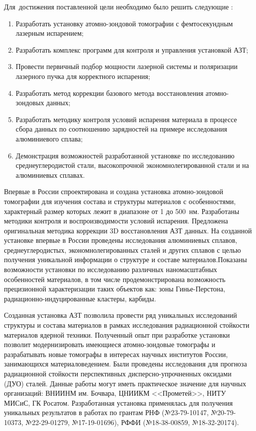 Для~достижения поставленной цели необходимо было решить следующие {\tasks}:
\begin{enumerate}[beginpenalty=10000]
  \item Разработать установку атомно-зондовой томографии с фемтосекундным лазерным испарением;
  \item Разработать комплекс программ для контроля и управления установкой АЗТ;
  \item Провести первичный подбор мощности лазерной системы и поляризации лазерного пучка для корректного испарения;  
  \item Разработать метод коррекции базового метода восстановления атомно-зондовых данных;
  \item Разработать методику контроля условий испарения материала в процессе сбора данных по соотношению зарядностей на примере исследования алюминиевого сплава;
  \item Демонстрация возможностей разработанной установке по исследованию среднеуглеродистой стали, высокопрочной экономнолегированной стали и на алюминиевых сплавах.
\end{enumerate}


{\novelty}
Впервые в России спроектирована и создана установка атомно-зондовой томографии для изучения состава и структуры материалов с особенностями, характерный размер которых лежит в диапазоне от 1 до 500~нм. Разработаны методики контроля и воспроизводимости условий испарения. Предложена оригинальная методика коррекции 3D восстановления АЗТ данных. На созданной установке впервые в России проведены исследования алюминиевых сплавов, среднеуглеродистых, экономнолегированных сталей и других сплавов с целью получения уникальной информации о структуре и составе материалов.Показаны возможности установки по исследованию различных наномасштабных особенностей материалов, в том числе продемонстрирована возможность прецизионной характеризации таких объектов как: зоны Гинье-Перстона, радиационно-индуцированные кластеры, карбиды.

{\influence} Созданная установка АЗТ позволила провести ряд уникальных исследований структуры и состава материалов в рамках исследования радиационной стойкости материалов ядерной техники. Полученный опыт при разработке установки позволит модернизировать имеющиеся атомно-зондовые томографы и разрабатывать новые томографы в интересах научных институтов России, занимающихся материаловедением. Были проведены исследования для прогноза радиационной стойкости перспективных дисперсно-упрочненных оксидами (ДУО) сталей. Данные работы могут иметь практическое значение для научных организаций: ВНИИНМ им. Бочвара, ЦНИИКМ <<Прометей>>, НИТУ МИСиС, ГК Росатом. Разработанная установка применялась для получения уникальных результатов в работах по грантам РНФ (№23-79-10147, №20-79-10373, №22-29-01279, №17-19-01696), РФФИ (№18-38-00859, №18-32-20174).

